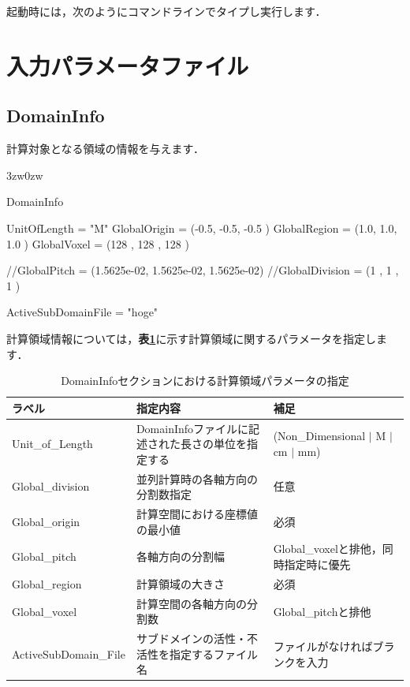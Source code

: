 起動時には，次のようにコマンドラインでタイプし実行します．
{
\small 
{}
}




\pagebreak
\section{入力パラメータファイル}


%
\subsection{DomainInfo}

計算対象となる領域の情報を与えます．

\begin{indentation}{3zw}{0zw}

{\small
\begin{program}
DomainInfo {
  UnitOfLength  = "M"
  GlobalOrigin  = (-0.5, -0.5, -0.5   )
  GlobalRegion  = (1.0,  1.0,  1.0    )
  GlobalVoxel   = (128   , 128   , 128   )
  
  //GlobalPitch    = (1.5625e-02, 1.5625e-02, 1.5625e-02)
  //GlobalDivision = (1    , 1    , 1    )

  ActiveSubDomainFile = "hoge"
}
\end{program}
}

計算領域情報については，\textbf{表\ref{tbl:region_info}}に示す計算領域に関するパラメータを指定します．

\begin{table}[htdp]
\caption{DomainInfoセクションにおける計算領域パラメータの指定}
\begin{center}
\small
\begin{tabular}{lll} \toprule
ラベル & 指定内容 & 補足\\ \midrule
Unit\_of\_Length & DomainInfoファイルに記述された長さの単位を指定する & (Non\_Dimensional $|$ M $|$ cm $|$ mm)\\
Global\_division & 並列計算時の各軸方向の分割数指定 & 任意\\ 
Global\_origin & 計算空間における座標値の最小値 & 必須\\
Global\_pitch & 各軸方向の分割幅 &Global\_voxelと排他，同時指定時に優先\\
Global\_region & 計算領域の大きさ & 必須\\ 
Global\_voxel & 計算空間の各軸方向の分割数 & Global\_pitchと排他\\
ActiveSubDomain\_File & サブドメインの活性・不活性を指定するファイル名 & ファイルがなければブランクを入力\\ \bottomrule
\end{tabular}
\end{center}
\label{tbl:region_info}
\end{table}

\end{indentation}



